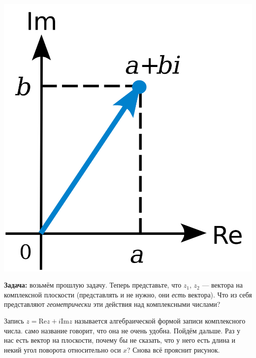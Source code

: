 \documentclass[12pt]{article}
\begin{document}
\begin{center}
\includegraphics[scale=0.1]{cn_plane.png}
\end{center}

{\bf Задача:} возьмём прошлую задачу. Теперь представьте, что $z_1$, $z_2$ --- вектора на комплексной плоскости (представлять и не нужно, они {\it есть} вектора). Что из себя представляют {\it геометрически} эти действия над комплексными числами?

Запись $z = \mbox{Re} z + i \mbox{Im} z$ называется алгебраической формой записи комплексного числа. само название говорит, что она не очень удобна. Пойдём дальше. Раз у нас есть вектор на плоскости, почему бы не сказать, что у него есть длина и некий угол поворота относительно оси $x$? Снова всё прояснит рисунок.
\end{document}
